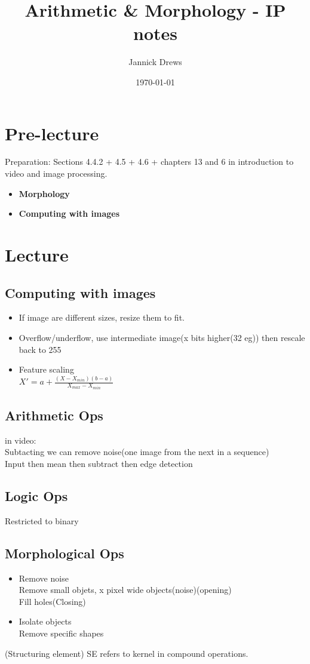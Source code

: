 \documentclass{article}
\title{Arithmetic \& Morphology - IP notes}
\author{Jannick Drews}
\date{\today}
\begin{document}
\maketitle
\newpage

\section{Pre-lecture}
Preparation: Sections 4.4.2 + 4.5 + 4.6 + chapters 13 and 6 in introduction to video and image processing.\\
\begin{itemize}
  \item \textbf{Morphology}
  \item \textbf{Computing with images}
\end{itemize}

\section{Lecture}
\subsection{Computing with images}
\begin{itemize}
    \item If image are different sizes, resize them to fit.
    \item Overflow/underflow, use intermediate image(x bits higher(32 eg)) then rescale back to 255
    \item Feature scaling\\
        $ X' = a + \frac{(X - X_{min})(b - a)}{X_{max} - X_{min}} $
\end{itemize}

\subsection{Arithmetic Ops}
in video:\\
Subtacting we can remove noise(one image from the next in a sequence)\\
Input then mean then subtract then edge detection\\
\subsection{Logic Ops}
Restricted to binary\\

\subsection{Morphological Ops}
\begin{itemize}
    \item Remove noise\\
        Remove small objets, x pixel wide objects(noise)(opening)\\
        Fill holes(Closing)\\
    \item Isolate objects\\
        Remove specific shapes\\
\end{itemize}
(Structuring element) SE refers to kernel in compound operations.
\end{document}
